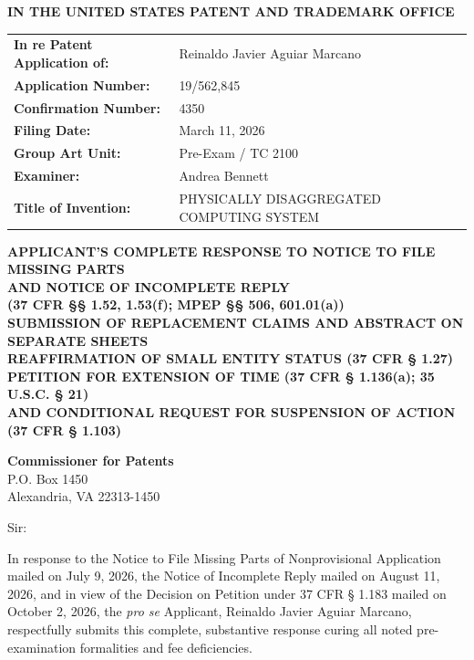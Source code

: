 \documentclass[11pt,letterpaper]{article}
\begin{document}
\thispagestyle{empty}

\begin{center}
    \large\textbf{IN THE UNITED STATES PATENT AND TRADEMARK OFFICE} \\
\end{center}

\vspace{0.3cm}
\noindent\begin{tabular}{p{2.3in}p{4.0in}}
\textbf{In re Patent Application of:} & Reinaldo Javier Aguiar Marcano \\
\textbf{Application Number:} & 19/562,845 \\
\textbf{Confirmation Number:} & 4350 \\
\textbf{Filing Date:} & March 11, 2026 \\
\textbf{Group Art Unit:} & Pre-Exam / TC 2100 \\
\textbf{Examiner:} & Andrea Bennett \\
\textbf{Title of Invention:} & PHYSICALLY DISAGGREGATED COMPUTING SYSTEM \\
\end{tabular}

\vspace{0.8cm}
\begin{center}
    \textbf{\large APPLICANT'S COMPLETE RESPONSE TO NOTICE TO FILE MISSING PARTS \\
    AND NOTICE OF INCOMPLETE REPLY \\
    (37 CFR \S\S{} 1.52, 1.53(f); MPEP \S\S{} 506, 601.01(a)) \\
    SUBMISSION OF REPLACEMENT CLAIMS AND ABSTRACT ON SEPARATE SHEETS \\
    REAFFIRMATION OF SMALL ENTITY STATUS (37 CFR \S{} 1.27) \\
    PETITION FOR EXTENSION OF TIME (37 CFR \S{} 1.136(a); 35 U.S.C. \S{} 21) \\
    AND CONDITIONAL REQUEST FOR SUSPENSION OF ACTION (37 CFR \S{} 1.103)}
\end{center}

\vspace{0.3cm}
\noindent\textbf{Commissioner for Patents} \\
\noindent P.O. Box 1450 \\
\noindent Alexandria, VA 22313-1450

\vspace{0.3cm}
\noindent Sir:

\noindent In response to the Notice to File Missing Parts of Nonprovisional Application mailed on July 9, 2026, the Notice of Incomplete Reply mailed on August 11, 2026, and in view of the Decision on Petition under 37 CFR \S{} 1.183 mailed on October 2, 2026, the \textit{pro se} Applicant, Reinaldo Javier Aguiar Marcano, respectfully submits this complete, substantive response curing all noted pre-examination formalities and fee deficiencies.
\end{document}

